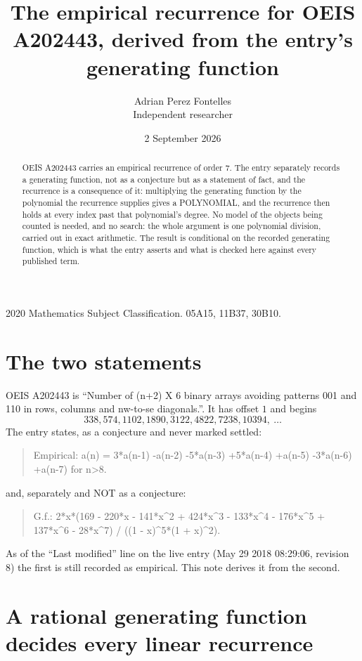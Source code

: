 \documentclass[11pt,a4paper]{article}
\title{The empirical recurrence for OEIS A202443, derived from the entry's generating function}
\author{Adrian Perez Fontelles\\ \small Independent researcher}
\date{2 September 2026}
\theoremstyle{plain}
\theoremstyle{definition}
\begin{document}
\maketitle

\begin{abstract}
OEIS A202443 carries an empirical recurrence of order $7$. The entry separately records a
generating function, not as a conjecture but as a statement of fact, and the recurrence is a
consequence of it: multiplying the generating function by the polynomial the recurrence
supplies gives a POLYNOMIAL, and the recurrence then holds at every index past that
polynomial's degree. No model of the objects being counted is needed, and no search: the
whole argument is one polynomial division, carried out in exact arithmetic. The result is
conditional on the recorded generating function, which is what the entry asserts and what is
checked here against every published term.
\end{abstract}

\noindent\small 2020 Mathematics Subject Classification. 05A15, 11B37, 30B10.\normalsize

\section{The two statements}

OEIS A202443 is ``Number of (n+2) X 6 binary arrays avoiding patterns 001 and 110 in rows, columns and nw-to-se diagonals.''. It has offset $1$ and begins
\[
338, 574, 1102, 1890, 3122, 4822, 7238, 10394,\ \dots
\]
The entry states, as a conjecture and never marked settled:
\begin{quote}
Empirical: a(n) = 3*a(n-1) -a(n-2) -5*a(n-3) +5*a(n-4) +a(n-5) -3*a(n-6) +a(n-7) for n>8.
\end{quote}
and, separately and NOT as a conjecture:
\begin{quote}
G.f.: 2*x*(169 - 220*x - 141*x\^{}2 + 424*x\^{}3 - 133*x\^{}4 - 176*x\^{}5 + 137*x\^{}6 - 28*x\^{}7) / ((1 - x)\^{}5*(1 + x)\^{}2).
\end{quote}
As of the ``Last modified'' line on the live entry (May 29 2018 08:29:06, revision 8) the first is still
recorded as empirical. This note derives it from the second.

\section{A rational generating function decides every linear recurrence}
\end{document}
